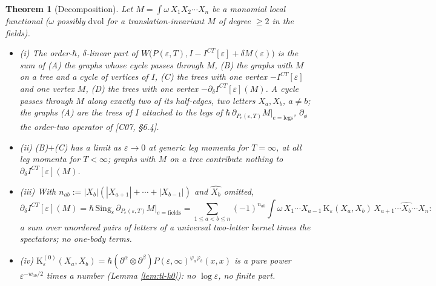 \documentclass[11pt]{article}
\numberwithin{equation}{section}
\theoremstyle{plain}
\newtheorem{theorem}{Theorem}[section]
\theoremstyle{definition}
\begin{document}
\begin{theorem}[Decomposition]
\label{thm:tl-decomp}
Let $M=\int\omega\,X_1X_2\cdots X_n$ be a monomial local functional ($\omega$ possibly $\mathrm{dvol}$ for a translation-invariant $M$ of degree $\ge2$ in the fields).
\begin{itemize}
\item (i) The order-$\hbar$, $\delta$-linear part of $W\big(P(\varepsilon,T),I-I^{CT}[\varepsilon]+\delta M(\varepsilon)\big)$ is the sum of (A) the graphs whose cycle passes through $M$, (B) the graphs with $M$ on a tree and a cycle of vertices of $I$, (C) the trees with one vertex $-I^{CT}[\varepsilon]$ and one vertex $M$, (D) the trees with one vertex $-\partial_\delta I^{CT}[\varepsilon](M)$. A cycle passes through $M$ along exactly two of its half-edges, two letters $X_a,X_b$, $a\ne b$; the graphs (A) are the trees of $I$ attached to the legs of $\hbar\,\partial_{P_e(\varepsilon,T)}M|_{e=\text{legs}}$, $\partial_\phi$ the order-two operator of [C07, §6.4].
\item (ii) (B)$+$(C) has a limit as $\varepsilon\to0$ at generic leg momenta for $T=\infty$, at all leg momenta for $T<\infty$; graphs with $M$ on a tree contribute nothing to $\partial_\delta I^{CT}[\varepsilon](M)$.
\item (iii) With $n_{ab}:=|X_b|(|X_{a+1}|+\cdots+|X_{b-1}|)$ and $\widehat{X_b}$ omitted,
\begin{equation}
\partial_\delta I^{CT}[\varepsilon](M)=\hbar\,\mathrm{Sing}_\varepsilon\,\partial_{P_e(\varepsilon,T)}M\Big|_{e=\text{fields}}
=\sum_{1\le a<b\le n}(-1)^{n_{ab}}\int\omega\,X_1\cdots X_{a-1}\,\mathrm K_\varepsilon(X_a,X_b)\,X_{a+1}\cdots\widehat{X_b}\cdots X_n :
\label{eq:tl-decomp}
\end{equation}
a sum over unordered pairs of letters of a universal two-letter kernel times the spectators; no one-body terms.
\item (iv) $\mathrm K^{(0)}_\varepsilon(X_a,X_b)=\hbar(\partial^\alpha\otimes\partial^\beta)P(\varepsilon,\infty)^{\varphi_a\varphi_b}(x,x)$ is a pure power $\varepsilon^{-w_{ab}/2}$ times a number (Lemma \ref{lem:tl-k0}): no $\log\varepsilon$, no finite part.
\end{itemize}
\end{theorem}
\end{document}
